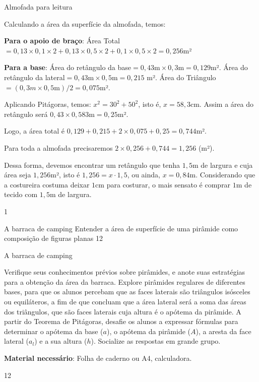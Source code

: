 \begin{answer}{Almofada para leitura}
{
Calculando a área da superfície da almofada, temos:

\textbf{Para o apoio de braço}: Área Total$=0{,}13\times0{,}1\times2+ 0{,}13\times 0{,}5 \times 2 + 0{,}1 \times 0{,}5 \times 2= 0{,}256$m²

\textbf{Para a base}: Área do retângulo da base$=0{,}43 \text{m} \times 0{,}3 \text{m} = 0{,}129$m². Área do retângulo da lateral$=0{,}43 \text{m} \times 0{,}5 \text{m} = 0{,}215$ m². Área do Triângulo $= (0{,}3 m \times 0{,}5 \text{m}) / 2=0{,}075$m².

Aplicando Pitágoras, temos: $x^2 = 30^2 + 50^2$, isto é, $x=58{,}3$cm. Assim a área do retângulo será $0{,}43\times0{,}583 \text{m}=0{,}25$m².

Logo, a área total é $0{,}129 + 0{,}215 + 2 \times 0{,}075 +0{,}25 = 0{,}744$m².

Para toda a almofada precisaremos $2 \times 0{,}256 + 0{,}744 = 1{,}256$ (m²).

Dessa forma, devemos encontrar um retângulo que tenha $1{,}5$m de largura e cuja área seja $1{,}256$m², isto é $1,256= x\cdot1{,}5$, ou ainda, $x=0{,}84$m. Considerando que a costureira costuma deixar $1$cm para costurar, o mais sensato é comprar $1$m de tecido com $1{,}5$m de largura.

}{1}
\end{answer}
\begin{objectives}{A barraca de camping}
{
  Entender a área de superfície de uma pirâmide como composição de figuras planas
}{1}{2}
\end{objectives}
\begin{sugestions}{A barraca de camping}
{
Verifique seus conhecimentos prévios sobre pirâmides, e anote suas estratégias para a obtenção da área da barraca. Explore pirâmides regulares de diferentes bases, para que os alunos percebam que as faces laterais são triângulos isósceles ou equiláteros, a fim de que concluam que a área lateral será a soma das áreas dos triângulos, que são faces laterais cuja altura é o apótema da pirâmide. A partir do Teorema de Pitágoras, desafie os alunos a expressar fórmulas para determinar o apótema da base ($a$), o apótema da pirâmide ($A$), a aresta da face lateral ($a_l$) e a sua altura ($h$). Socialize as respostas em grande grupo. 

\textbf{Material necessário}: Folha de caderno ou A4, calculadora.

}{1}{2}
\end{sugestions}
